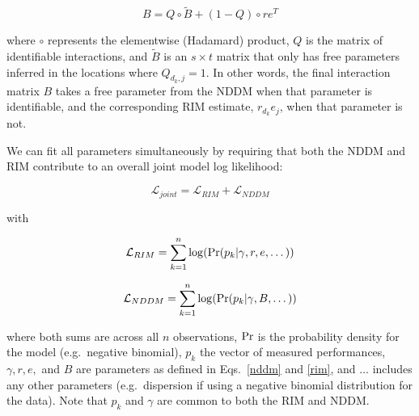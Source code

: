 \documentclass[a4,12pt]{article}
\begin{document}
        \begin{equation}
        B = Q \circ \tilde B + (1 - Q) \circ r e^T
        \label{matB}
        \end{equation}

    
    where $\circ$ represents the elementwise (Hadamard) product, $Q$ is the matrix of identifiable interactions, and $\tilde B$ is an $s \times t$ matrix that only has free parameters inferred in the locations where $Q_{d_k, j} =1$. In other words, the final interaction matrix $B$ takes a free parameter from the NDDM when that parameter is identifiable, and the corresponding RIM estimate, $r_{d_k} e_j$, when that parameter is not.

    We can fit all parameters simultaneously by requiring that both the NDDM and RIM  contribute to an overall joint model log likelihood:

         \begin{equation}
        \mathcal{L}_{joint} = \mathcal{L}_{RIM} + \mathcal{L}_{NDDM}
        \label{loglikjoint}
        \end{equation}

    with

        \begin{equation}
        \mathcal{L}_{RIM} = \sum_{k=1}^{n} \log ({\rm Pr} (p_k | \gamma, r, e, \dots))
        \label{logrim}
        \end{equation}

        \begin{equation}
        \mathcal{L}_{NDDM} = \sum_{k=1}^{n} \log ({\rm Pr} (p_k | \gamma, B, \dots))
        \label{lognddm}
        \end{equation}


    where both sums are across all $n$ observations, ${\rm Pr}$ is the probability density for the model (e.g.\ negative binomial), $p_k$ the vector of measured performances, $\gamma, r, e,$ and $B$ are parameters as defined in Eqs.~\ref{nddm} and \ref{rim}, and $\dots$ includes any other parameters (e.g.\ dispersion if using a negative binomial distribution for the data). Note that $p_k$ and $\gamma$ are common to both the RIM and NDDM.
\end{document}
